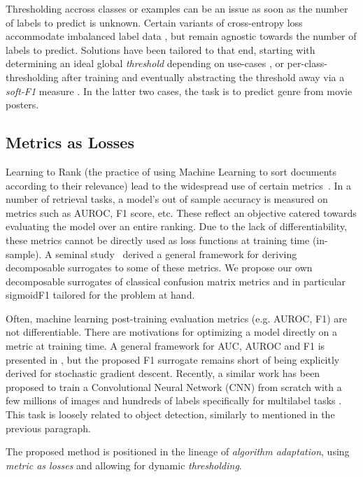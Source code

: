 Thresholding accross classes or examples can be an issue as soon as the number of labels to predict is unknown. Certain variants of cross-entropy loss accommodate imbalanced label data  \cite{focalLoss}, but remain agnostic towards the number of labels to predict. Solutions have been tailored to that end, starting with determining an ideal global \emph{threshold} depending on use-cases \cite{threshForF1}, or per-class-thresholding after training \cite{moviePosters} and eventually abstracting the threshold away via a \emph{soft-F1} measure \cite{softF1}. In the latter two cases, the task is to predict genre from movie posters.

\subsection{Metrics as Losses}

Learning to Rank (the practice of using Machine Learning to sort documents according to their relevance) lead to the widespread use of certain metrics~\cite{LTR}. In a number of retrieval tasks, a model's out of sample accuracy is measured on metrics such as AUROC, F1 score, etc. These reflect an objective catered towards evaluating the model over an entire ranking. Due to the lack of differentiability, these metrics cannot be directly used as loss functions at training time (in-sample). A seminal study~\cite{optimizableLosses} derived a general framework for deriving decomposable surrogates to some of these metrics. We propose our own decomposable surrogates of classical confusion matrix metrics and in particular sigmoidF1 tailored for the problem at hand.

Often, machine learning post-training evaluation metrics (e.g. AUROC, F1) are
not differentiable. There are motivations  for
optimizing a model directly on a metric at training time. A general framework
for AUC, AUROC and F1 is presented in \cite{optimizableLosses}, but the
proposed F1 surrogate remains short of being explicitly derived for stochastic
gradient descent. Recently, a similar work has been proposed to train a
Convolutional Neural Network (CNN) from scratch with a few millions of images
and hundreds of labels specifically for multilabel tasks \cite{tencent}. This
task is loosely related to object detection, similarly to
\cite{multitaskLabelImages} mentioned in the previous paragraph.


The proposed method is positioned in the lineage of \emph{algorithm adaptation}, using \emph{metric as losses} and allowing for dynamic \emph{thresholding}. 

